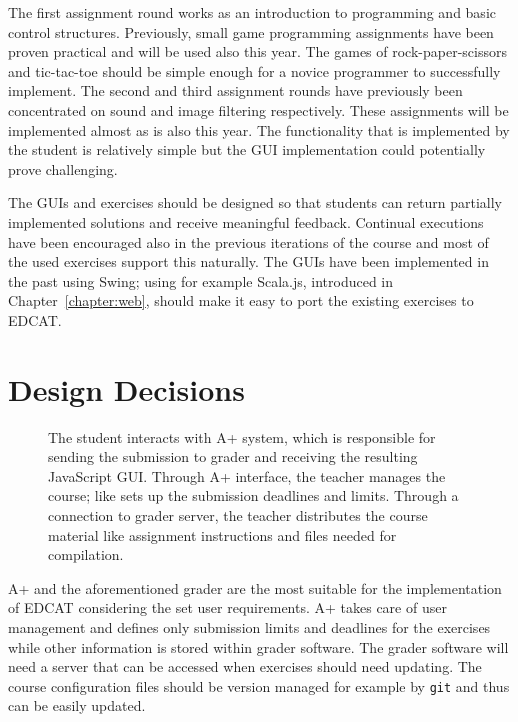 The first assignment round works as an introduction to programming and basic control structures. Previously, small game programming assignments have been proven practical and will be used also this year. The games of rock-paper-scissors and tic-tac-toe should be simple enough for a novice programmer to successfully implement. The second and third assignment rounds have previously been concentrated on sound and image filtering respectively. These assignments will be implemented almost as is also this year. The functionality that is implemented by the student is relatively simple but the GUI implementation could potentially prove challenging.

The GUIs and exercises should be designed so that students can return partially implemented solutions and receive meaningful feedback. Continual executions have been encouraged also in the previous iterations of the course and most of the used exercises support this naturally. The GUIs have been implemented in the past using Swing; using for example Scala.js, introduced in Chapter~\ref{chapter:web}, should make it easy to port the existing exercises to EDCAT. 


\section{Design Decisions}
\label{section:decisions}

\begin{figure}[!hb]
	\begin{center}
		
	\end{center}
	\caption[asdf]{The student interacts with A+ system, which is responsible for sending the submission to grader and receiving the resulting JavaScript GUI. Through A+ interface, the teacher manages the course; like sets up the submission deadlines and limits. Through a connection to grader server, the teacher distributes the course material like assignment instructions and files needed for compilation.}
	\label{figure:architecture}
\end{figure}

A+ and the aforementioned grader are the most suitable for the implementation of EDCAT considering the set user requirements. A+ takes care of user management and defines only submission limits and deadlines for the exercises while other information is stored within grader software. The grader software will need a server that can be accessed when exercises should need updating. The course configuration files should be version managed for example by \texttt{git} and thus can be easily updated.

